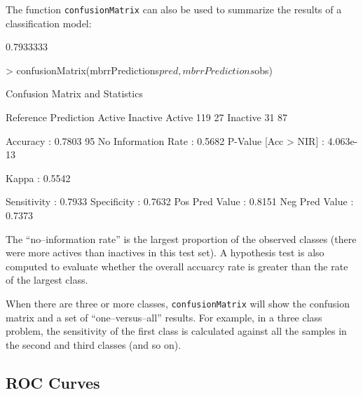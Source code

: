 \documentclass[12pt]{article}
\begin{document}
The function \texttt{confusionMatrix} can also be used to summarize the results of a classification model:

\begin{small}
\begin{Schunk}
\begin{Soutput}
[1] 0.7933333
\end{Soutput}
\begin{Sinput}
> confusionMatrix(mbrrPredictions$pred, mbrrPredictions$obs)
\end{Sinput}
\begin{Soutput}
Confusion Matrix and Statistics

          Reference
Prediction Active Inactive
  Active      119       27
  Inactive     31       87
                                       
            Accuracy : 0.7803          
              95% CI : (0.7255, 0.8287)
 No Information Rate : 0.5682          
 P-Value [Acc > NIR] : 4.063e-13       
                                       
               Kappa : 0.5542          
                                       
         Sensitivity : 0.7933          
         Specificity : 0.7632          
      Pos Pred Value : 0.8151          
      Neg Pred Value : 0.7373          
\end{Soutput}
\end{Schunk}
\end{small}

The ``no--information rate'' is the largest proportion of the observed classes (there were more actives than inactives in this test set). A hypothesis test is also computed to evaluate whether the overall accuarcy rate is greater than the rate of the largest class. 

When there are three or more classes, \texttt{confusionMatrix} will show the confusion matrix and a set of ``one--versus--all'' results. For example, in a three class problem, the sensitivity of the first class is calculated against all the samples in the second and third classes (and so on).


\subsection*{ROC Curves}
\end{document}
